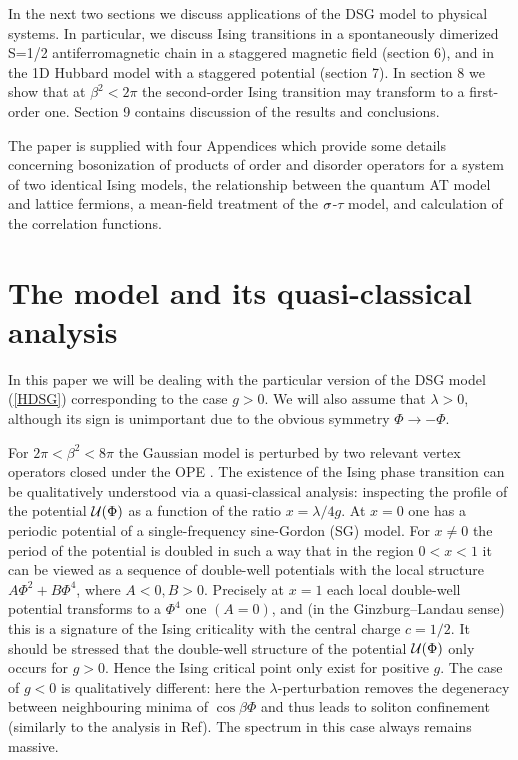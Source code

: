 In the next two
sections we discuss applications of the DSG
model to physical systems. In particular, we discuss Ising transitions
in a spontaneously dimerized S=1/2 antiferromagnetic chain in a staggered
magnetic field (section 6), and in the 1D Hubbard model with a staggered
potential (section 7). 
In section 8 we show that at $\beta^2 < 2\pi$ the second-order Ising transition
may transform to a first-order one. Section 9 contains discussion of the 
results and conclusions. 

The paper is supplied with four Appendices which provide some details 
concerning
bosonization of products of order and disorder operators for a system of two
identical Ising models, the relationship between the quantum AT model and
lattice fermions, a mean-field treatment of the $\sigma$-$\tau$ model,
and calculation of the correlation functions. 











\section{The model and its quasi-classical analysis}

In this paper we will be dealing with
the particular version of the DSG model (\ref{HDSG}) 
corresponding to the case $g >0$.
 We will also assume that $\lambda > 0$, although its
sign is unimportant due to the obvious symmetry $\Phi \to -\Phi$. 

For $2\pi<  \beta^2 < 8\pi$ the Gaussian model is perturbed by
two relevant vertex operators closed under the OPE \cite{DM}.
The existence of the Ising phase transition
can be qualitatively understood via
a quasi-classical analysis: inspecting the profile
of the potential ${\cal U} (\Phi)$ as a function of the ratio $x=\lambda/4g$.
At $x = 0$ one has a 
periodic potential of a single-frequency sine-Gordon (SG) model.
For $x \neq 0$ the period of the potential is doubled in such a way that
in the region $0 < x < 1$ 
it can be viewed as a sequence of double-well potentials
with the local structure $A \Phi^2 + B \Phi^4$, where $A<0, B>0$.
Precisely at $x=1$ each local double-well 
potential transforms to a $\Phi^4$ one
$(A=0)$, and (in the Ginzburg--Landau sense) 
this is a signature of the Ising criticality
with the central charge $c=1/2$.
It should be stressed that the double-well structure of the potential
${\cal U}(\Phi)$ only occurs for $g > 0$. 
Hence the Ising critical point only exist  for
positive $g$. The case of $g < 0$ is qualitatively different:
here the $\lambda$-perturbation removes the degeneracy between neighbouring
minima of $\cos\beta\Phi$ and thus leads to soliton 
confinement (similarly to the analysis in Ref\cite{aff-conf}). 
The spectrum in this case always remains massive. 

